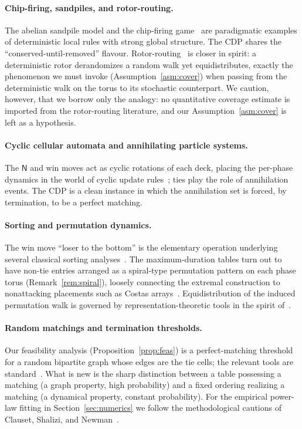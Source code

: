 \documentclass[11pt]{article}
\theoremstyle{definition}
\theoremstyle{remark}
\newcommand{\NN}{\mathsf{N}}
\begin{document}
\paragraph{Chip-firing, sandpiles, and rotor-routing.}
The abelian sandpile model and the chip-firing game~\cite{Dhar,Bjorner,LevinePeres} are paradigmatic examples
of deterministic local rules with strong global structure. The CDP shares the ``conserved-until-removed''
flavour. Rotor-routing~\cite{Holroyd} is closer in spirit: a deterministic rotor derandomizes a random walk yet
equidistributes, exactly the phenomenon we must invoke (Assumption~\ref{asm:cover}) when passing from the
deterministic walk on the torus to its stochastic counterpart. We caution, however, that we borrow only the
analogy: no quantitative coverage estimate is imported from the rotor-routing literature, and our
Assumption~\ref{asm:cover} is left as a hypothesis.

\paragraph{Cyclic cellular automata and annihilating particle systems.}
The $\NN$ and win moves act as cyclic rotations of each deck, placing the per-phase dynamics in the world of
cyclic update rules~\cite{Fisch,Bramson}; ties play the role of annihilation events. The CDP is a clean instance
in which the annihilation set is forced, by termination, to be a perfect matching.

\paragraph{Sorting and permutation dynamics.}
The win move ``loser to the bottom'' is the elementary operation underlying several classical sorting
analyses~\cite{Knuth}. The maximum-duration tables turn out to have non-tie entries arranged as a spiral-type
permutation pattern on each phase torus (Remark~\ref{rem:spiral}), loosely connecting the extremal construction
to nonattacking placements such as Costas arrays~\cite{Costas}. Equidistribution of the induced permutation walk
is governed by representation-theoretic tools in the spirit of~\cite{Diaconis,Stanley}.

\paragraph{Random matchings and termination thresholds.}
Our feasibility analysis (Proposition~\ref{prop:feas}) is a perfect-matching threshold for a random bipartite
graph whose edges are the tie cells; the relevant tools are standard~\cite{Bollobas,Janson,AlonSpencer,LP}. What
is new is the sharp distinction between a table possessing a matching (a graph property, high probability) and a
fixed ordering realizing a matching (a dynamical property, constant probability). For the empirical power-law
fitting in Section~\ref{sec:numerics} we follow the methodological cautions of Clauset, Shalizi, and
Newman~\cite{Clauset}.
\end{document}
